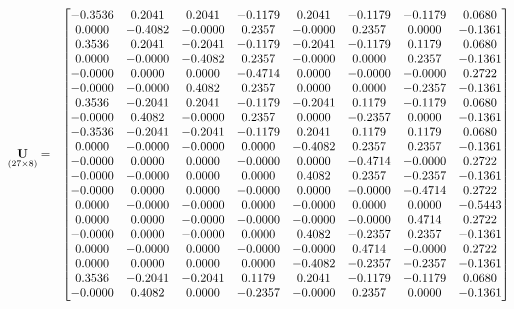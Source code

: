 \documentclass{glimmpse-report}
\begin{document}
\begin{eqnarray*}
\underset{\left(27\times8\right)}{\mathbf{U}} & = & \begin{bmatrix}-0.3536 & 0.2041 & 0.2041 & -0.1179 & 0.2041 & -0.1179 & -0.1179 & 0.0680\protect\\
0.0000 & -0.4082 & -0.0000 & 0.2357 & -0.0000 & 0.2357 & 0.0000 & -0.1361\protect\\
0.3536 & 0.2041 & -0.2041 & -0.1179 & -0.2041 & -0.1179 & 0.1179 & 0.0680\protect\\
0.0000 & -0.0000 & -0.4082 & 0.2357 & -0.0000 & 0.0000 & 0.2357 & -0.1361\protect\\
-0.0000 & 0.0000 & 0.0000 & -0.4714 & 0.0000 & -0.0000 & -0.0000 & 0.2722\protect\\
-0.0000 & -0.0000 & 0.4082 & 0.2357 & 0.0000 & 0.0000 & -0.2357 & -0.1361\protect\\
0.3536 & -0.2041 & 0.2041 & -0.1179 & -0.2041 & 0.1179 & -0.1179 & 0.0680\protect\\
-0.0000 & 0.4082 & -0.0000 & 0.2357 & 0.0000 & -0.2357 & 0.0000 & -0.1361\protect\\
-0.3536 & -0.2041 & -0.2041 & -0.1179 & 0.2041 & 0.1179 & 0.1179 & 0.0680\protect\\
0.0000 & -0.0000 & -0.0000 & 0.0000 & -0.4082 & 0.2357 & 0.2357 & -0.1361\protect\\
-0.0000 & 0.0000 & 0.0000 & -0.0000 & 0.0000 & -0.4714 & -0.0000 & 0.2722\protect\\
-0.0000 & -0.0000 & 0.0000 & 0.0000 & 0.4082 & 0.2357 & -0.2357 & -0.1361\protect\\
-0.0000 & 0.0000 & 0.0000 & -0.0000 & 0.0000 & -0.0000 & -0.4714 & 0.2722\protect\\
0.0000 & -0.0000 & -0.0000 & 0.0000 & -0.0000 & 0.0000 & 0.0000 & -0.5443\protect\\
0.0000 & 0.0000 & -0.0000 & -0.0000 & -0.0000 & -0.0000 & 0.4714 & 0.2722\protect\\
-0.0000 & 0.0000 & -0.0000 & 0.0000 & 0.4082 & -0.2357 & 0.2357 & -0.1361\protect\\
0.0000 & -0.0000 & 0.0000 & -0.0000 & -0.0000 & 0.4714 & -0.0000 & 0.2722\protect\\
0.0000 & 0.0000 & 0.0000 & 0.0000 & -0.4082 & -0.2357 & -0.2357 & -0.1361\protect\\
0.3536 & -0.2041 & -0.2041 & 0.1179 & 0.2041 & -0.1179 & -0.1179 & 0.0680\protect\\
-0.0000 & 0.4082 & 0.0000 & -0.2357 & -0.0000 & 0.2357 & 0.0000 & -0.1361\protect\\

\end{bmatrix}
\end{eqnarray*}
\end{document}
